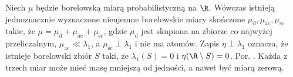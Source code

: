 \begin{twierdzenie}
Niech $\mu$ będzie borelowską miarą probabilistyczną na $\R$.
Wówczas istnieją jednoznacznie wyznaczone nieujemne
borelowskie miary skończone
$\mu_{\mathrm d},\mu_{\mathrm{ac}},\mu_{\mathrm{sc}}$
takie, że $\mu=\mu_{\mathrm d}+\mu_{\mathrm{ac}}+
\mu_{\mathrm{sc}}$, gdzie $\mu_{\mathrm d}$ jest skupiona
na zbiorze co najwyżej przeliczalnym,
$\mu_{\mathrm{ac}}\ll\lambda_1$,
a $\mu_{\mathrm{sc}}\perp\lambda_1$ i nie ma atomów.
Zapis $\eta\perp\lambda_1$ oznacza, że istnieje borelowski
zbiór $S$ taki, że $\lambda_1(S)=0$ i $\eta(\R\setminus S)=0$.
Por. .
Każda z trzech miar może mieć masę mniejszą od jedności,
a nawet być miarą zerową.
\end{twierdzenie}
